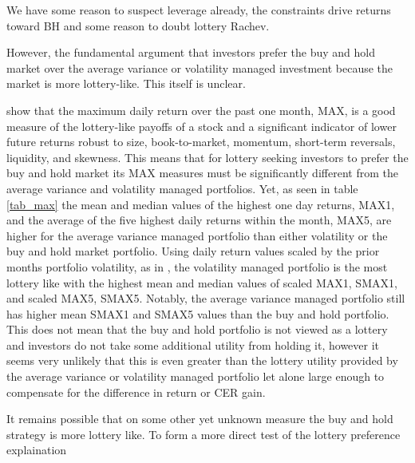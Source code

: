We have some reason to suspect leverage already, the constraints drive returns toward BH and some reason to doubt lottery Rachev.

However, the fundamental argument that investors prefer the buy and hold market over the average variance or volatility managed investment because the market is more lottery-like. This itself is unclear.

\citet{bali_maxing_2011} show that the maximum daily return over the past one month, MAX, is a good measure of the lottery-like payoffs of a stock and a significant indicator of lower future returns robust to size, book-to-market, momentum, short-term reversals, liquidity, and skewness. This means that for lottery seeking investors to prefer the buy and hold market its MAX measures must be significantly different from the average variance and volatility managed portfolios. Yet, as seen in table \ref{tab_max} the mean and median values of the highest one day returns, MAX1, and the average of the five highest daily returns within the month, MAX5, are higher for the average variance managed portfolio than either volatility or the buy and hold market portfolio. Using daily return values scaled by the prior months portfolio volatility, as in \citet{asness_betting_2018}, the volatility managed portfolio is the most lottery like with the highest mean and median values of scaled MAX1, SMAX1, and scaled MAX5, SMAX5. Notably, the average variance managed portfolio still has higher mean SMAX1 and SMAX5 values than the buy and hold portfolio. This does not mean that the buy and hold portfolio is not viewed as a lottery and investors do not take some additional utility from holding it, however it seems very unlikely that this is even greater than the lottery utility provided by the average variance or volatility managed portfolio let alone large enough to compensate for the difference in return or CER gain.

It remains possible that on some other yet unknown measure the buy and hold strategy is more lottery like. To form a more direct test of the lottery preference explaination 